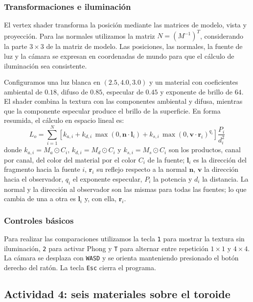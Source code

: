 \subsubsection{Transformaciones e iluminación}

El vertex shader transforma la posición mediante las matrices de modelo, vista y proyección. Para las normales utilizamos la matriz $N=(M^{-1})^{T}$, considerando la parte $3\times3$ de la matriz de modelo. Las posiciones, las normales, la fuente de luz y la cámara se expresan en coordenadas de mundo para que el cálculo de iluminación sea consistente.

Configuramos una luz blanca en $(2.5,4.0,3.0)$ y un material con coeficientes ambiental de $0.18$, difuso de $0.85$, especular de $0.45$ y exponente de brillo de $64$. El shader combina la textura con las componentes ambiental y difusa, mientras que la componente especular produce el brillo de la superficie. En forma resumida, el cálculo en espacio lineal es:
\begin{equation}
    L_o = \sum_{i=1}^{N} \left[ k_{a,i} + k_{d,i}\,\max(0, \mathbf{n} \cdot \mathbf{l}_i) + k_{s,i}\,\max(0, \mathbf{v} \cdot \mathbf{r}_i)^{q_i} \right] \frac{P_i}{d_i^2}
    \label{eq:phong_multi}
\end{equation}
donde $k_{a,i} = M_a \odot C_i$, $k_{d,i} = M_d \odot C_i$ y $k_{s,i} = M_s \odot C_i$ son los productos, canal por canal, del color del material por el color $C_i$ de la fuente; $\mathbf{l}_i$ es la dirección del fragmento hacia la fuente $i$, $\mathbf{r}_i$ su reflejo respecto a la normal $\mathbf{n}$, $\mathbf{v}$ la dirección hacia el observador, $q_i$ el exponente especular, $P_i$ la potencia y $d_i$ la distancia. La normal y la dirección al observador son las mismas para todas las fuentes; lo que cambia de una a otra es $\mathbf{l}_i$ y, con ella, $\mathbf{r}_i$.


\subsubsection{Controles básicos}

Para realizar las comparaciones utilizamos la tecla \texttt{1} para mostrar la textura sin iluminación, \texttt{2} para activar Phong y \texttt{T} para alternar entre repetición $1\times1$ y $4\times4$. La cámara se desplaza con \texttt{WASD} y se orienta manteniendo presionado el botón derecho del ratón. La tecla \texttt{Esc} cierra el programa.

\subsection{Actividad 4: seis materiales sobre el toroide}
\label{sec:act4_metodologia}

